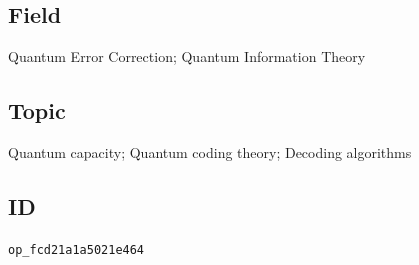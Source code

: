 \subsection*{Field}

Quantum Error Correction; Quantum Information Theory

\subsection*{Topic}

Quantum capacity; Quantum coding theory; Decoding algorithms

\subsection*{ID}

\texttt{op\_fcd21a1a5021e464}
